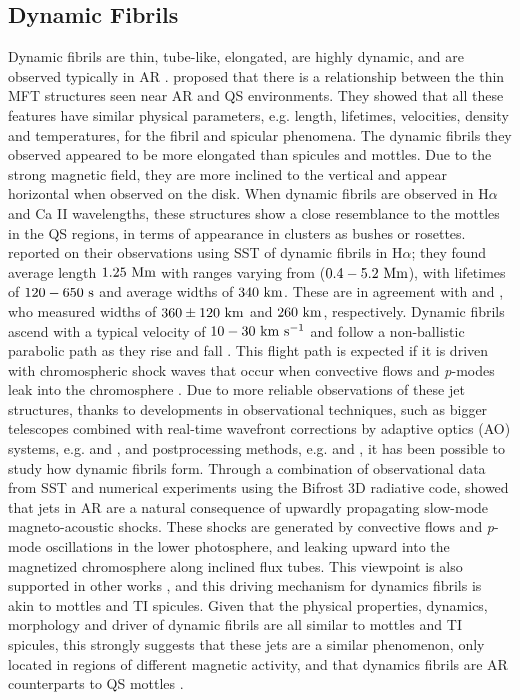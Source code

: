 \subsection{Dynamic Fibrils}
\label{subsec:dfibs}
Dynamic fibrils are thin, tube-like, elongated, are highly dynamic, and are observed typically in AR \citep{De_Pontieu2007ApJ,Hansteen2006ApJ}. \cite{Foukal1971SoPh1959F,Foukal1971SoPh20298F} proposed that there is a relationship between the thin MFT structures seen near AR and QS environments. They showed that all these features have similar physical parameters, e.g. length, lifetimes, velocities, density and temperatures, for the fibril and spicular phenomena. The dynamic fibrils they observed appeared to be more elongated than spicules and mottles. Due to the strong magnetic field, they are more inclined to the vertical and appear horizontal when observed on the disk. When dynamic fibrils are observed in H$\alpha$ and Ca II wavelengths, these structures show a close resemblance to the mottles in the QS regions, in terms of appearance in clusters as bushes or rosettes. \cite{De_Pontieu2007ApJ} reported on their observations using SST of dynamic fibrils in H$\alpha$; they found average length $1.25~\rm{Mm}$ with ranges varying from ($0.4-5.2~\rm{Mm}$), with lifetimes of $120-650~\rm{s}$ and average widths of $340~\rm{km}$. These are in agreement with \cite{Morton2012NatCo31315M} and \cite{Gafeira2017ApJS2297G}, who measured widths of $360\pm120~\rm{km}$ and $260~\rm{km}$, respectively. Dynamic fibrils ascend with a typical velocity of $10-30~\rm{km ~s^{-1}}$ and follow a non-ballistic parabolic path as they rise and fall \cite{Beckers1968}. This flight path is expected if it is driven with chromospheric shock waves that occur when convective flows and \textit{p}-modes leak into the chromosphere \citep{Langangen2008ApJ6731194L,De_Pontieu2007ApJ}. \np
%
Due to more reliable observations of these jet structures, thanks to developments in observational techniques, such as bigger telescopes combined with real-time wavefront corrections by adaptive optics (AO) systems, e.g. \cite{Scharmer2003SPIE4853370S} and \cite{Rimmele2000SPIE4007218R}, and postprocessing methods, e.g. \cite{van2005SoPh228191V} and \cite{von1993AA268374V}, it has been possible to study how dynamic fibrils form. Through a combination of observational data from SST and numerical experiments using the Bifrost 3D radiative code, \cite{Hansteen2006ApJ} showed that jets in AR are a natural consequence of upwardly propagating slow-mode magneto-acoustic shocks. These shocks are generated by convective flows and \textit{p}-mode oscillations in the lower photosphere, and leaking upward into the magnetized chromosphere along inclined flux tubes. This viewpoint is also supported in other works \citep{Heggland2007ApJ6661277H,De_Pontieu2007ApJ,Pontieu2004Natur,Suematsu1990LNP367211S}, and this driving mechanism for dynamics fibrils is akin to mottles and TI spicules. Given that the physical properties, dynamics, morphology and driver of dynamic fibrils are all similar to mottles and TI spicules, this strongly suggests that these jets are a similar phenomenon, only located in regions of different magnetic activity, and that dynamics fibrils are AR counterparts to QS mottles \citep{Rouppe2007ApJ660L169R}.
